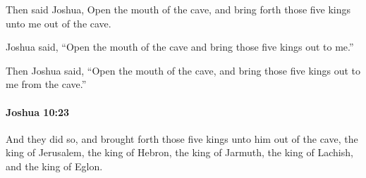 			\begin{versebox}
					\item[BHS] 
					\item[ASV] Then said Joshua, Open the mouth of the cave, and bring forth those five kings unto me out of the cave.
					\item[NIV] Joshua said, “Open the mouth of the cave and bring those five kings out to me.”
					\item[NRSV] Then Joshua said, “Open the mouth of the cave, and bring those five kings out to me from the cave.”
			\end{versebox}

		\paragraph{Joshua 10:23} %
			\label{JOSHUA-10-23}

			And they did so, and brought forth those five kings unto him out of the cave, the king of Jerusalem, the king of Hebron, the king of Jarmuth, the king of Lachish, and the king of Eglon.

